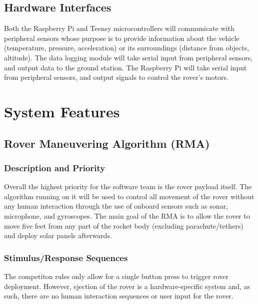 \documentclass[onecolumn, draftclsnofoot, 10pt, compsoc]{IEEEtran}
\begin{document}
\subsection{Hardware Interfaces}
Both the Raspberry Pi and Teensy microcontrollers will communicate with peripheral sensors whose purpose is to provide information about the vehicle (temperature, pressure, acceleration) or its surroundings (distance from objects, altitude). The data logging module will take serial input from peripheral sensors, and output data to the ground station. The Raspberry Pi will take serial input from peripheral sensors, and output signals to control the rover's motors.

\section{System Features}


\subsection{Rover Maneuvering Algorithm (RMA)}
\subsubsection{Description and Priority}
Overall the highest priority for the software team is the rover payload itself.
The algorithm running on it will be used to control all movement of the rover without any human interaction through the use of onboard sensors such as sonar, microphone, and gyroscopes.
The main goal of the RMA is to allow the rover to move five feet from any part of the rocket body (excluding parachute/tethers) and deploy solar panels afterwards.

\subsubsection{Stimulus/Response Sequences}
The competiton rules only allow for a single button press to trigger rover deployment. However, ejection of the rover is a hardware-specific system and, as such, there are no human interaction sequences or user input for the rover.
\end{document}
